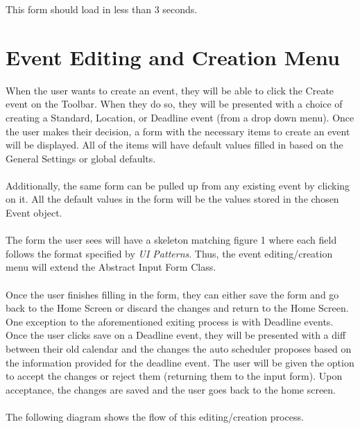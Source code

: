 \documentclass{scrreprt}
\begin{document}
This form should load in less than 3 seconds. \\

\section{Event Editing and Creation Menu}

When the user wants to create an event, they will be able to click the Create event on the Toolbar.  When they do so, they will be presented with a choice of creating a Standard, Location, or Deadline event (from a drop down menu). Once the user makes their decision, a form with the necessary items to create an event will be displayed.  All of the items will have default values filled in based on the General Settings or global defaults.
\\\\
Additionally, the same form can be pulled up from any existing event by clicking on  it.  All the default values in the form will be the values stored in the chosen Event object.
\\\\
The form the user sees will have a skeleton matching figure 1 where each field follows the format specified by \textit{UI Patterns}.  Thus, the event editing/creation menu will extend the Abstract Input Form Class.
\\\\
Once the user finishes filling in the form, they can either save the form and go back to the Home Screen or discard the changes and return to the Home Screen.
\\
One exception to the aforementioned exiting process is with Deadline events.  Once the user clicks save on a Deadline event, they will be presented with a diff between their old calendar and the changes the auto scheduler proposes based on the information provided for the deadline event.  The user will be given the option to accept the changes or reject them (returning them to the input form).  Upon acceptance, the changes are saved and the user goes back to the home screen.
\\\\
The following diagram shows the flow of this editing/creation process.
\\\\
\end{document}
